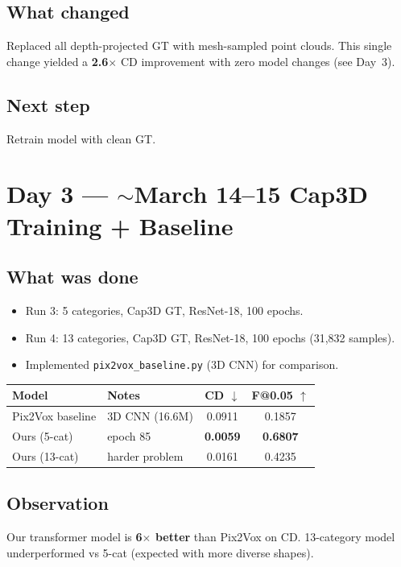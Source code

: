 \documentclass[10pt,a4paper]{article}
\begin{document}
\subsection*{What changed}
Replaced all depth-projected GT with mesh-sampled point clouds. This single change yielded a \textbf{2.6$\times$} CD improvement with zero model changes (see Day~3).

\subsection*{Next step}
Retrain model with clean GT.

\section*{Day 3 --- $\sim$March 14--15 \hfill \normalfont\small Cap3D Training + Baseline}

\subsection*{What was done}
\begin{itemize}[nosep]
    \item Run 3: 5 categories, Cap3D GT, ResNet-18, 100 epochs.
    \item Run 4: 13 categories, Cap3D GT, ResNet-18, 100 epochs (31,832 samples).
    \item Implemented \texttt{pix2vox\_baseline.py} (3D CNN) for comparison.
\end{itemize}

\begin{center}
\begin{tabular}{llcc}
\toprule
\textbf{Model} & \textbf{Notes} & \textbf{CD $\downarrow$} & \textbf{F@0.05 $\uparrow$} \\
\midrule
Pix2Vox baseline & 3D CNN (16.6M) & 0.0911 & 0.1857 \\
Ours (5-cat) & epoch 85 & \textbf{0.0059} & \textbf{0.6807} \\
Ours (13-cat) & harder problem & 0.0161 & 0.4235 \\
\bottomrule
\end{tabular}
\end{center}

\subsection*{Observation}
Our transformer model is \textbf{6$\times$ better} than Pix2Vox on CD. 13-category model underperformed vs 5-cat (expected with more diverse shapes).
\end{document}

